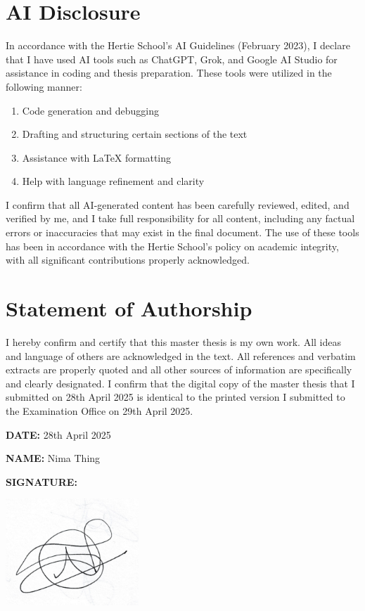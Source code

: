 \documentclass[12pt,a4paper]{report}
\begin{document}
\printbibliography[title={References}]

\clearpage
\chapter*{AI Disclosure}
In accordance with the Hertie School's AI Guidelines (February 2023), I declare that I have used AI tools such as ChatGPT, Grok, and Google AI Studio for assistance in coding and thesis preparation. These tools were utilized in the following manner: 
\begin{enumerate}
\item Code generation and debugging
\item Drafting and structuring certain sections of the text
\item Assistance with LaTeX formatting
\item Help with language refinement and clarity
\end{enumerate}
I confirm that all AI-generated content has been carefully reviewed, edited, and verified by me, and I take full responsibility for all content, including any factual errors or inaccuracies that may exist in the final document. The use of these tools has been in accordance with the Hertie School's policy on academic integrity, with all significant contributions properly acknowledged.

\clearpage
\chapter*{Statement of Authorship}
I hereby confirm and certify that this master thesis is my own work. All ideas and language of others are acknowledged in the text. All references and verbatim extracts are properly quoted and all other sources of information are specifically and clearly designated. I confirm that the digital copy of the master thesis that I submitted on 28th April 2025 is identical to the printed version I submitted to the Examination Office on 29th April 2025.

\vspace{1cm}
\textbf{DATE:} 28th April 2025 \par
\vspace{0.5cm}

\textbf{NAME:} Nima Thing \par
\vspace{0.5cm}

\textbf{SIGNATURE:} \par
\vspace{0.2cm}
\includegraphics[width=5cm]{figures/NimaThing_SignatureRAW.jpeg} %
\end{document}
